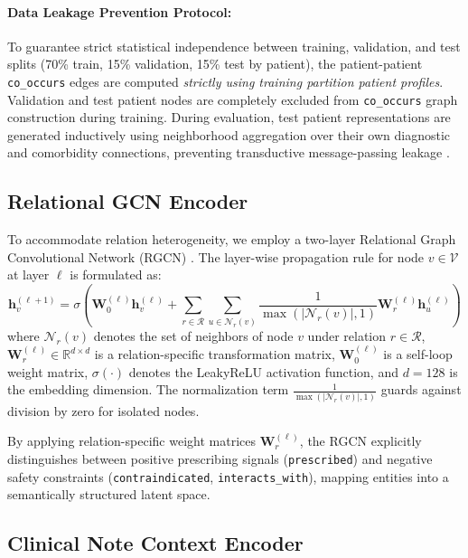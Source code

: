 \documentclass[11pt,a4paper]{article}
\begin{document}
\paragraph{Data Leakage Prevention Protocol:}
To guarantee strict statistical independence between training, validation, and test splits (70\% train, 15\% validation, 15\% test by patient), the patient-patient \texttt{co\_occurs} edges are computed \emph{strictly using training partition patient profiles}. Validation and test patient nodes are completely excluded from \texttt{co\_occurs} graph construction during training. During evaluation, test patient representations are generated inductively using neighborhood aggregation over their own diagnostic and comorbidity connections, preventing transductive message-passing leakage \cite{hamilton2017inductive}.

\subsection{Relational GCN Encoder}

To accommodate relation heterogeneity, we employ a two-layer Relational Graph Convolutional Network (RGCN) \cite{schlichtkrull2018modeling}. The layer-wise propagation rule for node $v \in \mathcal{V}$ at layer $\ell$ is formulated as:
\begin{equation}
\mathbf{h}_v^{(\ell+1)} = \sigma \left( \mathbf{W}_0^{(\ell)} \mathbf{h}_v^{(\ell)} + \sum_{r \in \mathcal{R}} \sum_{u \in \mathcal{N}_r(v)} \frac{1}{\max(|\mathcal{N}_r(v)|, 1)} \mathbf{W}_r^{(\ell)} \mathbf{h}_u^{(\ell)} \right)
\label{eq:rgcn}
\end{equation}
where $\mathcal{N}_r(v)$ denotes the set of neighbors of node $v$ under relation $r \in \mathcal{R}$, $\mathbf{W}_r^{(\ell)} \in \mathbb{R}^{d \times d}$ is a relation-specific transformation matrix, $\mathbf{W}_0^{(\ell)}$ is a self-loop weight matrix, $\sigma(\cdot)$ denotes the LeakyReLU activation function, and $d=128$ is the embedding dimension. The normalization term $\frac{1}{\max(|\mathcal{N}_r(v)|, 1)}$ guards against division by zero for isolated nodes. 

By applying relation-specific weight matrices $\mathbf{W}_r^{(\ell)}$, the RGCN explicitly distinguishes between positive prescribing signals (\texttt{prescribed}) and negative safety constraints (\texttt{contraindicated}, \texttt{interacts\_with}), mapping entities into a semantically structured latent space.

\subsection{Clinical Note Context Encoder}
\end{document}
